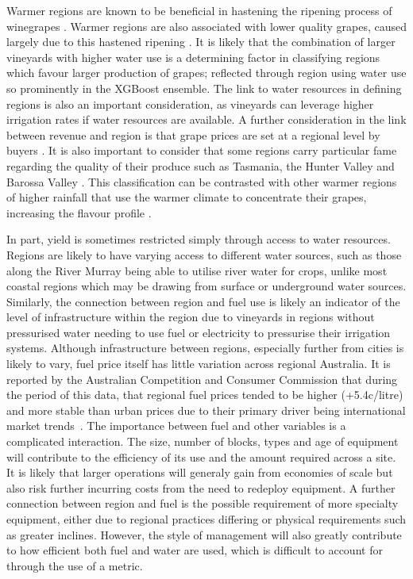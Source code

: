 \documentclass[review,12pt,authoryear]{elsarticle}
\begin{document}
\begin{linenumbers}
Warmer regions are known to be beneficial in hastening the ripening process of winegrapes \citep{webbObservedTrendsWinegrape2011}. Warmer regions are also associated with lower quality grapes, caused largely due to this hastened ripening \citep{botting1996canopy}. It is likely that the combination of larger vineyards with higher water use is a determining factor in classifying regions which favour larger production of grapes; reflected through region using water use so prominently in the XGBoost ensemble. The link to water resources in defining regions is also an important consideration, as vineyards can leverage higher irrigation rates if water resources are available. A further consideration in the link between revenue and region is that grape prices are set at a regional level by buyers \citep{wineaustraliaNationalVintageReport2022}. It is also important to consider that some regions carry particular fame regarding the quality of their produce such as Tasmania, the Hunter Valley and Barossa Valley \citep{hallidayAustralianWineEncyclopedia2009}. This classification can be contrasted with other warmer regions of higher rainfall that use the warmer climate to concentrate their grapes, increasing the flavour profile \citep{goodwinijeriepRegulatedDeficitIrrigation1992,mgmccarthyEffectCropLoad1986}.
\par
In part, yield is sometimes restricted simply through access to water resources. Regions are likely to have varying access to different water sources, such as those along the River Murray being able to utilise river water for crops, unlike most coastal regions which may be drawing from surface or underground water sources. Similarly, the connection between region and fuel use is likely an indicator of the level of infrastructure within the region due to vineyards in regions without pressurised water needing to use fuel or electricity to pressurise their irrigation systems. Although infrastructure between regions, especially further from cities is likely to vary, fuel price itself has little variation across regional Australia. It is reported by the Australian Competition and Consumer Commission that during the period of this data, that regional fuel prices tended to be higher (+5.4c/litre) and more stable than urban prices due to their primary driver being international market trends~\citep{aipFactsPricesRegional2019}. The importance between fuel and other variables is a complicated interaction. The size, number of blocks, types and age of equipment will contribute to the efficiency of its use and the amount required across a site. It is likely that larger operations will generaly gain from economies of scale but also risk further incurring costs from the need to redeploy equipment. A further connection between region and fuel is the possible requirement of more specialty equipment, either due to regional practices differing or physical requirements such as greater inclines. However, the style of management will also greatly contribute to how efficient both fuel and water are used, which is difficult to account for through the use of a metric.

\end{linenumbers}
\end{document}
